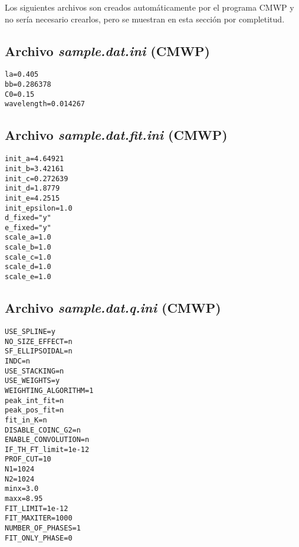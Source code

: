 Los siguientes archivos son creados automáticamente por el programa CMWP y no sería necesario crearlos, pero se muestran en esta sección por completitud.
\subsection{Archivo \textit{sample.dat.ini} (CMWP)}
\begin{lstlisting}
la=0.405
bb=0.286378
C0=0.15
wavelength=0.014267
\end{lstlisting}

\subsection{Archivo \textit{sample.dat.fit.ini} (CMWP)}
\begin{lstlisting}
init_a=4.64921
init_b=3.42161
init_c=0.272639
init_d=1.8779
init_e=4.2515
init_epsilon=1.0
d_fixed="y"
e_fixed="y"
scale_a=1.0
scale_b=1.0
scale_c=1.0
scale_d=1.0
scale_e=1.0
\end{lstlisting}

\subsection{Archivo \textit{sample.dat.q.ini} (CMWP)}
\begin{lstlisting}
USE_SPLINE=y
NO_SIZE_EFFECT=n
SF_ELLIPSOIDAL=n
INDC=n
USE_STACKING=n
USE_WEIGHTS=y
WEIGHTING_ALGORITHM=1
peak_int_fit=n
peak_pos_fit=n
fit_in_K=n
DISABLE_COINC_G2=n
ENABLE_CONVOLUTION=n
IF_TH_FT_limit=1e-12
PROF_CUT=10
N1=1024
N2=1024
minx=3.0
maxx=8.95
FIT_LIMIT=1e-12
FIT_MAXITER=1000
NUMBER_OF_PHASES=1
FIT_ONLY_PHASE=0
\end{lstlisting}
